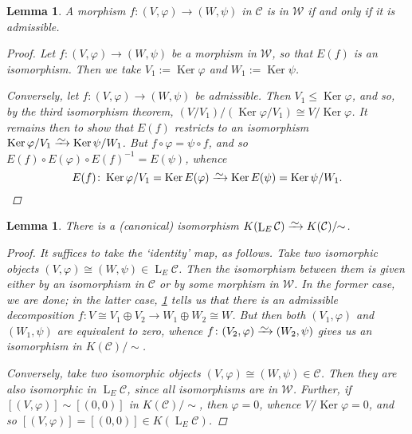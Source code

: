 \documentclass[11pt,fleqn]{article}
\theoremstyle{plain}
\newtheorem{lemma}[theorem]{Lemma}
\theoremstyle{definition}
\theoremstyle{remark}
\numberwithin{equation}{theorem}
\newcommand{\congto}{\xrightarrow{\raisebox{-.5ex}[0ex][0ex]{$\sim$}}}
\DeclareMathOperator{\Ker}{Ker}
\DeclareMathOperator{\LL}{L}
\begin{document}
        \begin{lemma}\label{lemma:admissible-example-definition}
            A morphism $f\colon(V,\varphi)\to(W,\psi)$ in $\mathcal{C}$ is in $\mathcal{W}$ if and only if it is admissible.
            \begin{proof}
                Let $f\colon(V,\varphi)\to(W,\psi)$ be a morphism in $\mathcal{W}$, so that $E(f)$ is an isomorphism.
                Then we take $V_1:=\Ker\varphi$ and $W_1:=\Ker\psi$.

                Conversely, let $f\colon(V,\varphi)\to(W,\psi)$ be admissible.
                Then $V_1\leqslant\Ker\varphi$, and so, by the third isomorphism theorem, $(V/V_1)/(\Ker\varphi/V_1)\cong V/\Ker\varphi$.
                It remains then to show that $E(f)$ restricts to an isomorphism $\Ker\varphi/V_1\congto\Ker\psi/W_1$.
                But $f\circ\varphi=\psi\circ f$, and so $E(f)\circ E(\varphi)\circ E(f)^{-1}=E(\psi)$, whence
                \[
                    E(f)\colon\Ker\varphi/V_1=\Ker E(\varphi)\congto\Ker E(\psi)=\Ker\psi/W_1.\qedhere
                \]
            \end{proof}
        \end{lemma}

        \begin{lemma}\label{lemma:admissible-example-isomorphism}
            There is a (canonical) isomorphism $K(\LL_E\mathcal{C})\congto K(\mathcal{C})/\!\!\sim$.
            \begin{proof}
                It suffices to take the `identity' map, as follows. Take two isomorphic objects $(V,\varphi)\cong(W,\psi)\in \LL_E\mathcal{C}$. 
                Then the isomorphism between them is given either by an isomorphism in $\mathcal{C}$ or by some morphism in $\mathcal{W}$.
                In the former case, we are done; in the latter case, \cref{lemma:admissible-example-definition} tells us that there is an admissible decomposition $f\colon V\cong V_1\oplus V_2\to W_1\oplus W_2\cong W$.
                But then both $(V_1,\varphi)$ and $(W_1,\psi)$ are equivalent to zero, whence $f\colon(V_2,\varphi)\congto(W_2,\psi)$ gives us an isomorphism in $K(\mathcal{C})/\!\!\sim$.

                Conversely, take two isomorphic objects $(V,\varphi)\cong(W,\psi)\in\mathcal{C}$. Then they are also isomorphic in $\LL_E\mathcal{C}$, since all isomorphisms are in $\mathcal{W}$.
                Further, if \mbox{$[(V,\varphi)]\sim[(0,0)]$} in $K(\mathcal{C})/\!\!\sim$, then $\varphi=0$, whence $V/\Ker\varphi=0$, and so $[(V,\varphi)]=[(0,0)]\in K(\LL_E\mathcal{C})$.
            \end{proof}
        \end{lemma}
\end{document}
